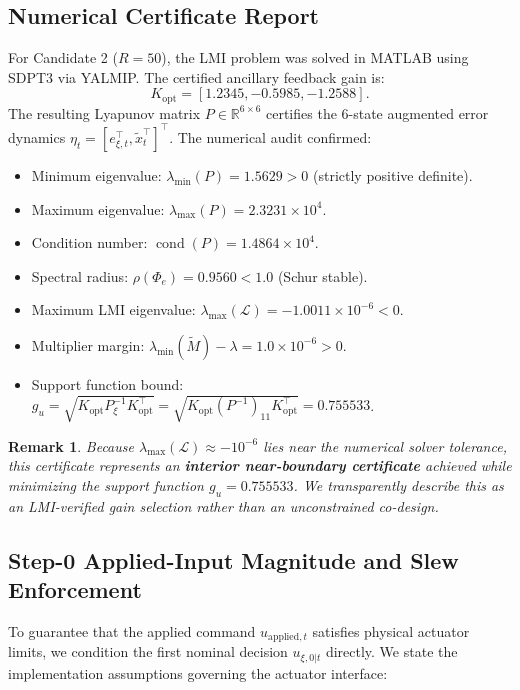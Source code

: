 \documentclass[journal]{IEEEtran}
\newtheorem{remark}{Remark}
\begin{document}
\subsection{Numerical Certificate Report}

For Candidate 2 ($R=50$), the LMI problem was solved in MATLAB using SDPT3 via YALMIP. The certified ancillary feedback gain is:
\begin{equation}
K_{\mathrm{opt}} = [1.2345, -0.5985, -1.2588].
\end{equation}
The resulting Lyapunov matrix $P \in \mathbb{R}^{6 \times 6}$ certifies the 6-state augmented error dynamics $\eta_t = [e_{\xi,t}^\top, \tilde x_t^\top]^\top$. The numerical audit confirmed:
\begin{itemize}
    \item Minimum eigenvalue: $\lambda_{\min}(P) = 1.5629 > 0$ (strictly positive definite).
    \item Maximum eigenvalue: $\lambda_{\max}(P) = 2.3231 \times 10^4$.
    \item Condition number: $\operatorname{cond}(P) = 1.4864\times 10^4$.
    \item Spectral radius: $\rho(\Phi_e) = 0.9560 < 1.0$ (Schur stable).
    \item Maximum LMI eigenvalue: $\lambda_{\max}(\mathcal{L}) = -1.0011\times 10^{-6} < 0$.
    \item Multiplier margin: $\lambda_{\min}(\widetilde{M}) - \lambda = 1.0\times 10^{-6} > 0$.
    \item Support function bound: $g_u = \sqrt{K_{\mathrm{opt}} P_\xi^{-1} K_{\mathrm{opt}}^\top} = \sqrt{K_{\mathrm{opt}} (P^{-1})_{11} K_{\mathrm{opt}}^\top} = 0.755533$.
\end{itemize}
\begin{remark}
Because $\lambda_{\max}(\mathcal{L}) \approx -10^{-6}$ lies near the numerical solver tolerance, this certificate represents an \textbf{interior near-boundary certificate} achieved while minimizing the support function $g_u = 0.755533$. We transparently describe this as an \emph{LMI-verified gain selection} rather than an unconstrained co-design.
\end{remark}

\subsection{Step-0 Applied-Input Magnitude and Slew Enforcement}

To guarantee that the applied command $u_{\mathrm{applied},t}$ satisfies physical actuator limits, we condition the first nominal decision $u_{\xi,0|t}$ directly. We state the implementation assumptions governing the actuator interface:
\end{document}
